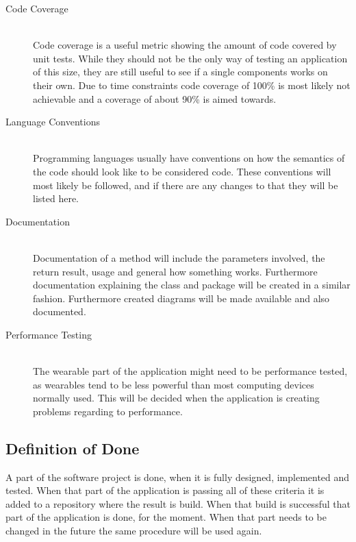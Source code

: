 \begin{description}
	\item[Code Coverage] \hfill \\
		Code coverage is a useful metric showing the amount of code covered by unit tests. While they should not be the only way of testing an application of this size, they are still useful to see if a single components works on their own. Due to time constraints code coverage of 100\% is most likely not achievable and a coverage of about 90\% is aimed towards.
	\item[Language Conventions] \hfill \\
		Programming languages usually have conventions on how the semantics of the code should look like to be considered code. These conventions will most likely be followed, and if there are any changes to that they will be listed here.
	\item[Documentation] \hfill \\
		Documentation of a method will include the parameters involved, the return result, usage and general how something works. Furthermore documentation explaining the class and package will be created in a similar fashion. Furthermore created diagrams will be made available and also documented.
	\item[Performance Testing] \hfill \\
		The wearable part of the application might need to be performance tested, as wearables tend to be less powerful than most computing devices normally used. This will be decided when the application is creating problems regarding to performance.
\end{description}
\subsection{Definition of Done}
A part of the software project is done, when it is fully designed, implemented and tested. When that part of the application is passing all of these criteria it is added to a repository where the result is build. When that build is successful that part of the application is done, for the moment. When that part needs to be changed in the future the same procedure will be used again.